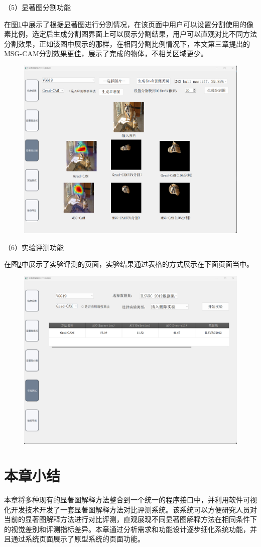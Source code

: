 （5）显著图分割功能

在图\ref{fig:f5}中展示了根据显著图进行分割情况，在该页面中用户可以设置分割使用的像素比例，选定后生成分割图界面上可以展示分割结果，用户可以直观对比不同方法分割效果，正如该图中展示的那样，在相同分割比例情况下，本文第三章提出的MSG-CAM分割效果更佳，展示了完成的物体，不相关区域更少。

\begin{figure}[h]
	\centering 
	\includegraphics[width=15cm]{fig/ch5/f5.png}
	\label{fig:f5}
\end{figure}

（6）实验评测功能

在图\ref{fig:f6}中展示了实验评测的页面，实验结果通过表格的方式展示在下面页面当中。

\begin{figure}[h]
	\centering 
	\includegraphics[width=15cm]{fig/ch5/f6.png}
	\label{fig:f6}
\end{figure}

\section{本章小结}
本章将多种现有的显著图解释方法整合到一个统一的程序接口中，并利用软件可视化开发技术开发了一套显著图解释方法对比评测系统。该系统可以方便研究人员对当前的显著图解释方法进行对比评测，直观展现不同显著图解释方法在相同条件下的视觉差别和评测指标差异。本章通过分析需求和功能设计逐步细化系统功能，并且通过系统页面展示了原型系统的页面功能。